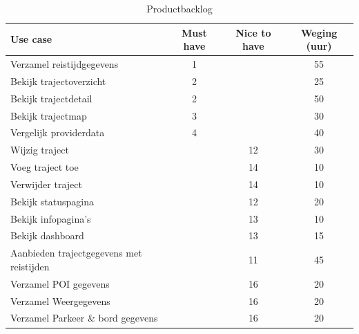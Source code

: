 \documentclass[a4paper]{article}
\begin{document}
\begin{table}[H]
\centering
\begin{tabular}{|l|c|c|c|} 
\hline
\textbf{Use case} & \textbf{Must have} & \textbf{Nice to have}  & \textbf{Weging (uur)}\\ \hline \hline
Verzamel reistijdgegevens & 1 & & 55 \\ \hline 
Bekijk trajectoverzicht & 2 & & 25 \\ \hline 
Bekijk trajectdetail & 2 & & 50 \\ \hline 
Bekijk trajectmap & 3 & & 30 \\ \hline 
Vergelijk providerdata & 4 & & 40 \\ \hline
Wijzig traject & & 12 & 30 \\ \hline
Voeg traject toe & & 14 & 10 \\ \hline
Verwijder traject & & 14 & 10 \\ \hline
Bekijk statuspagina & & 12 & 20 \\ \hline 
Bekijk infopagina's & & 13 & 10 \\ \hline 
Bekijk dashboard & & 13 & 15 \\ \hline 
Aanbieden trajectgegevens met reistijden & & 11 & 45 \\ \hline
Verzamel POI gegevens & & 16 & 20 \\ \hline
Verzamel Weergegevens & & 16 & 20 \\ \hline
Verzamel Parkeer \& bord gegevens & & 16 & 20 \\ \hline
\end{tabular}
\caption{Productbacklog \label{productbacklog}}
\end{table}

\newpage

\listoffigures
\listoftables
\end{document}
